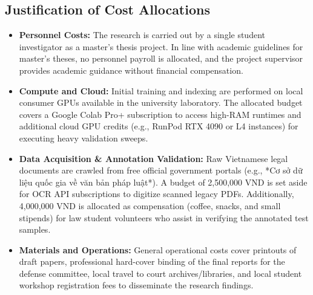 \subsection{Justification of Cost Allocations}
\begin{itemize}
    \item \textbf{Personnel Costs:} The research is carried out by a single student investigator as a master's thesis project. In line with academic guidelines for master's theses, no personnel payroll is allocated, and the project supervisor provides academic guidance without financial compensation.
    \item \textbf{Compute and Cloud:} Initial training and indexing are performed on local consumer GPUs available in the university laboratory. The allocated budget covers a Google Colab Pro+ subscription to access high-RAM runtimes and additional cloud GPU credits (e.g., RunPod RTX 4090 or L4 instances) for executing heavy validation sweeps.
    \item \textbf{Data Acquisition \& Annotation Validation:} Raw Vietnamese legal documents are crawled from free official government portals (e.g., *Cơ sở dữ liệu quốc gia về văn bản pháp luật*). A budget of 2,500,000 VND is set aside for OCR API subscriptions to digitize scanned legacy PDFs. Additionally, 4,000,000 VND is allocated as compensation (coffee, snacks, and small stipends) for law student volunteers who assist in verifying the annotated test samples.
    \item \textbf{Materials and Operations:} General operational costs cover printouts of draft papers, professional hard-cover binding of the final reports for the defense committee, local travel to court archives/libraries, and local student workshop registration fees to disseminate the research findings.
\end{itemize}
